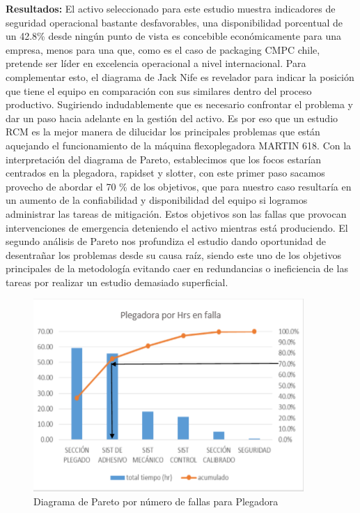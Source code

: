 \begin{description}
\item \textbf{Resultados:} El activo seleccionado para este estudio muestra indicadores de seguridad operacional bastante desfavorables, una disponibilidad porcentual de un 42.8\% desde ningún punto de vista es concebible económicamente para una empresa, menos para una que, como es el caso de packaging CMPC chile, pretende ser líder en excelencia operacional a nivel internacional. Para complementar esto, el diagrama de Jack Nife es revelador para indicar la posición que tiene el equipo en comparación con sus similares dentro del proceso productivo. Sugiriendo indudablemente que es necesario confrontar el problema y dar un paso hacia adelante en la gestión del activo. Es por eso que un estudio RCM es la mejor manera de dilucidar los principales problemas que están aquejando el funcionamiento de la máquina flexoplegadora MARTIN 618.
 Con la interpretación del diagrama de Pareto, establecimos que los focos estarían centrados en la plegadora, rapidset y slotter, con este primer paso sacamos provecho de abordar el 70 \% de los objetivos, que para nuestro caso resultaría en un aumento de la confiabilidad y disponibilidad del equipo si logramos administrar las tareas de mitigación. Estos objetivos son las fallas que provocan intervenciones de emergencia deteniendo el activo mientras está produciendo. El segundo análisis de Pareto nos profundiza el estudio dando oportunidad de desentrañar los problemas desde su causa raíz, siendo este uno de los objetivos principales de la metodología evitando caer en redundancias o ineficiencia de las tareas por realizar un estudio demasiado superficial. 
 
 \begin{figure}[H]
 \centering
 \includegraphics[scale=0.8]{images/plegadorapareto.png}
 \caption{Diagrama de Pareto por número de fallas para Plegadora \citep{cruz2018}}
 \end{figure}
 

\end{description}

